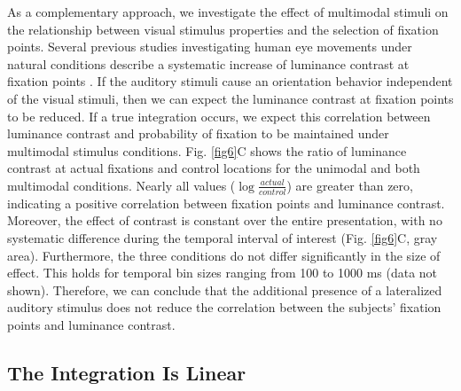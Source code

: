 As a complementary approach, we investigate the effect of multimodal
stimuli on the relationship between visual stimulus properties and the
selection of fixation points. Several previous studies investigating human
eye movements under natural conditions describe a systematic increase of
luminance contrast at fixation points \citep{reinagel1999a, tatler2005a}.
If the auditory stimuli cause an orientation behavior independent of the
visual stimuli, then we can expect the luminance contrast at fixation
points to be reduced. If a true integration occurs, we expect this
correlation between luminance contrast and probability of fixation to be
maintained under multimodal stimulus conditions. Fig. \ref{fig6}C shows the
ratio of luminance contrast at actual fixations and control locations for
the unimodal and both multimodal conditions. Nearly all values
($\log\frac{actual}{control}$) are greater than zero, indicating a positive
correlation between fixation points and luminance contrast. Moreover, the
effect of contrast is constant over the entire presentation, with no
systematic difference during the temporal interval of interest
(Fig. \ref{fig6}C, gray area). Furthermore, the three conditions do not differ
significantly in the size of effect. This holds for temporal bin sizes
ranging from 100 to 1000 ms (data not shown). Therefore, we can conclude
that the additional presence of a lateralized auditory stimulus does not
reduce the correlation between the subjects' fixation points and luminance
contrast. 

\subsection{The Integration Is Linear}

